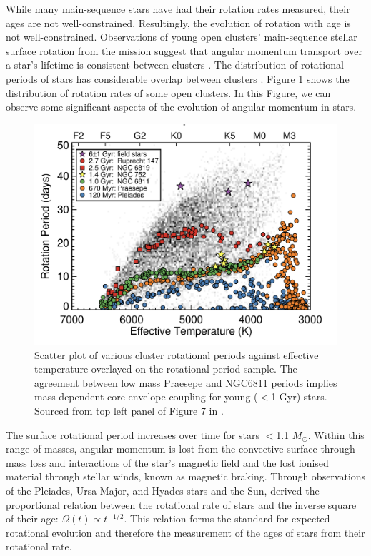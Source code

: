 While many main-sequence stars have had their rotation rates measured, their ages are not well-constrained.
Resultingly, the evolution of rotation with age is not well-constrained.
Observations of young open clusters' main-sequence stellar surface rotation from the \kepler{} mission suggest that angular momentum transport over a star's lifetime is consistent between clusters \citep{spada_competing_2020}.
The distribution of rotational periods of stars has considerable overlap between clusters \citep{spina_how_2020, curtis_when_2020}. 
Figure \ref{fig:cluster_rotational_periods} shows the distribution of rotation rates of some open clusters.
In this Figure, we can observe some significant aspects of the evolution of angular momentum in stars.

\begin{figure}[h]
    \includegraphics[width=\textwidth]{Figures/intro_figures/cluster_kepler.png}
    \caption[Cluster rotational periods against effective temperature]{Scatter plot of various cluster rotational periods against effective temperature overlayed on the \kepler{} \citep{mcquillan_rotation_2014} rotational period sample.
    The agreement between low mass Praesepe and NGC6811 periods implies mass-dependent core-envelope coupling for young ($<$1 Gyr) stars.
    Sourced from top left panel of Figure 7 in \citet{curtis_when_2020}.}
    \label{fig:cluster_rotational_periods}
\end{figure}

The surface rotational period increases over time for stars $<$1.1 $M_{\odot}$.
Within this range of masses, angular momentum is lost from the convective surface through mass loss and interactions of the star's magnetic field and the lost ionised material through stellar winds, known as magnetic braking.
Through observations of the Pleiades, Ursa Major, and Hyades stars and the Sun, \citet{skumanich_time_1972} derived the proportional relation between the rotational rate of stars and the inverse square of their age: $\Omega(t) \propto t^{-1/2}$.
This relation forms the standard for expected rotational evolution and therefore the measurement of the ages of stars from their rotational rate.

